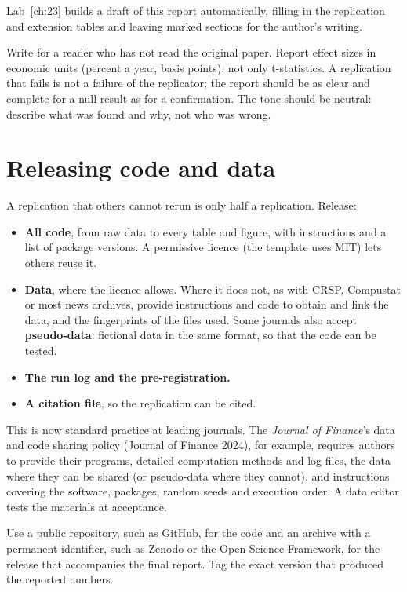 Lab~\ref{ch:23} builds a draft of this report automatically, filling in the replication and extension tables and leaving marked sections for the author's writing.

Write for a reader who has not read the original paper. Report effect sizes in economic units (percent a year, basis points), not only t-statistics. A replication that fails is not a failure of the replicator; the report should be as clear and complete for a null result as for a confirmation. The tone should be neutral: describe what was found and why, not who was wrong.

\section{Releasing code and data}
\label{sec:23-release}

A replication that others cannot rerun is only half a replication. Release:

\begin{itemize}
  \item \textbf{All code}, from raw data to every table and figure, with instructions and a list of package versions. A permissive licence (the template uses MIT) lets others reuse it.
  \item \textbf{Data}, where the licence allows. Where it does not, as with CRSP, Compustat or most news archives, provide instructions and code to obtain and link the data, and the fingerprints of the files used. Some journals also accept \textbf{pseudo-data}: fictional data in the same format, so that the code can be tested.
  \item \textbf{The run log and the pre-registration.}
  \item \textbf{A citation file}, so the replication can be cited.
\end{itemize}

This is now standard practice at leading journals. The \emph{Journal of Finance}'s data and code sharing policy (Journal of Finance 2024), for example, requires authors to provide their programs, detailed computation methods and log files, the data where they can be shared (or pseudo-data where they cannot), and instructions covering the software, packages, random seeds and execution order. A data editor tests the materials at acceptance.

Use a public repository, such as GitHub, for the code and an archive with a permanent identifier, such as Zenodo or the Open Science Framework, for the release that accompanies the final report. Tag the exact version that produced the reported numbers.

